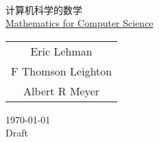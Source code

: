 
\begin{titlepage}
\begin{center}
  \hfill\\
  \vspace{1cm}
  {\fontsize{36pt}{40pt}\NotoSansSCBold{} 计算机科学的数学}\\
  \vspace{1em}
  {\LARGE\serif \href{https://courses.csail.mit.edu/6.042/spring17/mcs.pdf}{Mathematics for Computer Science}}\\
  \vspace{1cm}
  \vspace{1cm}
  
  {\large\serif
  \begin{tabular}{c}
    Eric Lehman \\
    F Thomson Leighton \\
    Albert R Meyer
  \end{tabular}
  }
   
  \vfill
  {\large \today}\\
  \vspace{1em}
  {\large Draft}
\end{center}
\end{titlepage}

